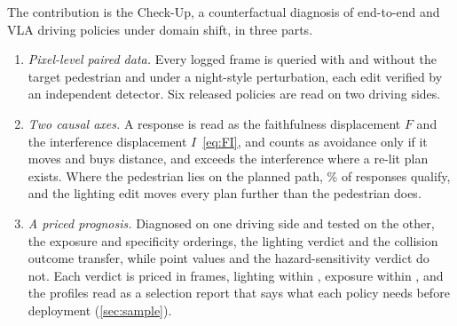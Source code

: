 The contribution is the Check-Up, a counterfactual diagnosis of end-to-end and VLA driving
policies under domain shift, in three parts.
\begin{enumerate}\itemsep2pt
\item \emph{Pixel-level paired data.} Every logged frame is queried with and without the target
      pedestrian and under a night-style perturbation, each edit verified by an
      independent detector. Six released policies are read on two driving sides.
\item \emph{Two causal axes.} A response is read as the faithfulness displacement $F$ and the
      interference displacement $I$~\eqref{eq:FI}, and counts as avoidance only if it moves and buys distance, and exceeds the interference where a re-lit plan exists. Where the pedestrian lies on the planned path, \NumCfRealPct\%
      of responses qualify, and the lighting edit moves every plan further than the pedestrian does.
\item \emph{A priced prognosis.} Diagnosed on one driving side and tested on the other, the exposure and specificity orderings, the lighting verdict and the collision outcome transfer, while point values and the hazard-sensitivity verdict do not. Each verdict is priced in frames, lighting within \NumNstarCFRhi, exposure within \NumNstarExpHi, and the profiles read as a selection report that says what each policy needs before deployment (\cref{sec:sample}).
\end{enumerate}







